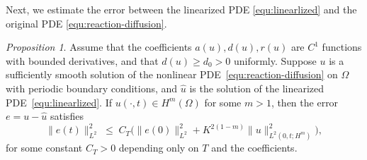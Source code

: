 \documentclass[preprint,12pt]{elsarticle}
\theoremstyle{definition}
\theoremstyle{remark}
\newtheorem{proposition}{Proposition}
\begin{document}
Next, we estimate the error between the linearized PDE \eqref{equ:linearlized} and the original PDE \eqref{equ:reaction-diffusion}.\begin{proposition}
Assume that the coefficients $a(u), d(u), r(u)$ are $C^1$ functions with bounded derivatives, and that $d(u)\ge d_0>0$ uniformly. 
Suppose $u$ is a sufficiently smooth solution of the nonlinear PDE~\eqref{equ:reaction-diffusion} on $\Omega$ with periodic  boundary conditions, and $\hat u$ is the solution of the linearized PDE~\eqref{equ:linearlized}. 
If $u(\cdot,t)\in H^m(\Omega)$ for some $m>1$, then the error $e=u-\hat u$ satisfies
\[
\|e(t)\|_{L^2}^2 \;\le\; C_T\Big(\|e(0)\|_{L^2}^2 + K^{2(1-m)}\|u\|_{L^2(0,t;H^m)}^2\Big),
\]
for some constant $C_T>0$ depending only on $T$ and the coefficients.
\end{proposition}
\end{document}
